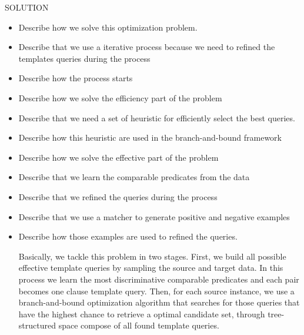 SOLUTION

\begin{itemize}

\item Describe how we solve this optimization problem. 
\item Describe that we use a iterative process because we need to refined the templates queries during the process

\item Describe how the process starts
\item Describe how we solve the efficiency part of the problem
\item Describe that we need a set of heuristic for efficiently select the best queries.
\item Describe how this heuristic are used in the branch-and-bound framework

\item Describe how we solve the effective part of the problem
\item Describe that we learn the comparable predicates from the data
\item Describe that we refined the queries during the process
\item Describe that we use a matcher to generate positive and negative examples
\item Describe how those examples are used to refined the queries. 

 

Basically, we tackle this problem in two stages. First, we build all possible effective template queries by sampling the source and target data. In this process we learn the most discriminative comparable predicates and each pair becomes one clause template query. Then, for each source instance, we use a branch-and-bound optimization algorithm that searches for those queries that have the highest chance to retrieve a optimal candidate set, through tree-structured space compose of all found template queries. 


\end{itemize}
